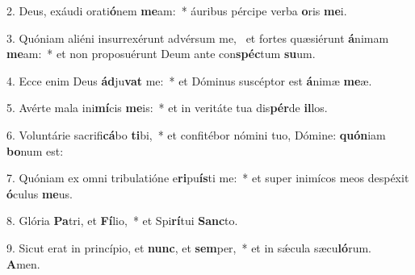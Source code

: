 2. Deus, exáudi orati\textbf{ó}nem \textbf{me}am:~*  áuribus pércipe verba \textbf{o}ris \textbf{me}i.\

3. Quóniam aliéni insurrexérunt advérsum me, \dag\  et fortes quæsiérunt \textbf{á}nimam \textbf{me}am:~*  et non proposuérunt Deum ante con\textbf{spéc}tum \textbf{su}um.\

4. Ecce enim Deus \textbf{ád}ju\textbf{vat} me:~*  et Dóminus suscéptor est \textbf{á}nimæ \textbf{me}æ.\

5. Avérte mala ini\textbf{mí}cis \textbf{me}is:~*  et in veritáte tua dis\textbf{pér}de \textbf{il}los.\

6. Voluntárie sacrifi\textbf{cá}bo \textbf{ti}bi,~*  et confitébor nómini tuo, Dómine: \textbf{quón}iam \textbf{bo}num est:\

7. Quóniam ex omni tribulatióne e\textbf{ri}pu\textbf{ís}ti me:~*  et super inimícos meos despéxit \textbf{ó}culus \textbf{me}us.\

8. Glória \textbf{Pa}tri, et \textbf{Fí}lio,~*  et Spi\textbf{rí}tui \textbf{Sanc}to.\

9. Sicut erat in princípio, et \textbf{nunc}, et \textbf{sem}per,~*  et in sǽcula sæcu\textbf{ló}rum. \textbf{A}men.\


